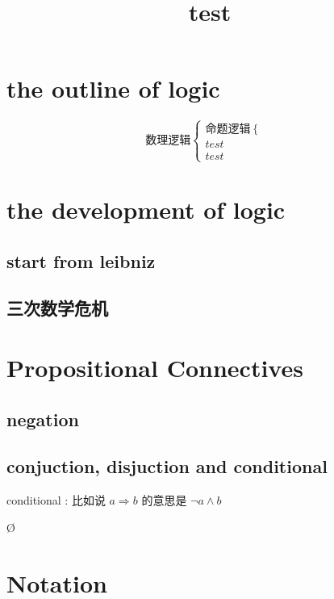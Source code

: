 \documentclass[a4paper, 10pt]{ctexart} %
\title{test}
\begin{document}
\maketitle

\section{the outline of logic}
\[
    \text{数理逻辑}
    \begin{cases}
        \text{命题逻辑}
        \begin{cases}
            \text{}\\
            \text{}
        \end{cases}\\
        test\\
        test
    \end{cases}
\]
\section{the development of logic}
\subsection{start from leibniz}
\subsection{三次数学危机}
\section{Propositional Connectives}
\subsection{negation}
\subsection{conjuction, disjuction and conditional}

conditional : 比如说 $a\Rightarrow b$ 的意思是 $\neg a \land b$

\O
\section{Notation}
\end{document}
